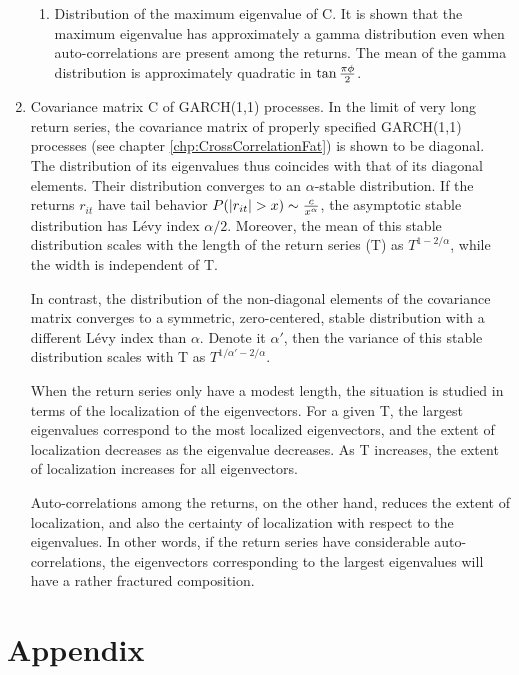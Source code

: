 \documentclass{report}
\begin{document}
\begin{enumerate}
\begin{enumerate}
  \item Distribution of the maximum eigenvalue of C. It is shown that
    the maximum eigenvalue has approximately a gamma distribution even
    when auto-correlations are present among the returns. The mean of
    the gamma distribution is approximately quadratic in $\tan{\pi\phi
      \over 2}$.
  \end{enumerate}

\item Covariance matrix C of GARCH(1,1) processes. In the limit of
  very long return series, the covariance matrix of properly
  specified GARCH(1,1) processes (see chapter
  \ref{chp:CrossCorrelationFat}) is 
  shown to be diagonal. The distribution of its eigenvalues thus
  coincides with that of its diagonal elements. Their distribution
  converges to an $\alpha$-stable distribution. If the returns $r_{it}$
  have tail behavior $P(|r_{it}| > x) \sim {c \over x^\alpha}$, the
  asymptotic stable distribution has L\'evy index
  $\alpha/2$. Moreover, the mean of this stable distribution scales
  with the length of the return series (T) as $T^{1 - 2/\alpha}$,
  while the width is independent of T.

  In contrast, the distribution of the non-diagonal elements of the
  covariance matrix converges to a symmetric, zero-centered, stable
  distribution with a different L\'evy index than $\alpha$. Denote it
  $\alpha'$, then the variance of this stable distribution scales with
  T as $T^{1/\alpha' - 2/\alpha}$.

  When the return series only have a modest length, the situation is
  studied in terms of the localization of the eigenvectors. For a
  given T, the largest eigenvalues correspond to the most localized
  eigenvectors, and the extent of localization decreases as the
  eigenvalue decreases. As T increases, the extent of localization
  increases for all eigenvectors.

  Auto-correlations among the returns, on the other hand, reduces the
  extent of localization, and also the certainty of localization with
  respect to the eigenvalues. In other words, if the return series
  have considerable auto-correlations, the eigenvectors corresponding
  to the largest eigenvalues will have a rather fractured composition.
\end{enumerate}

\chapter{Appendix}
\end{document}
